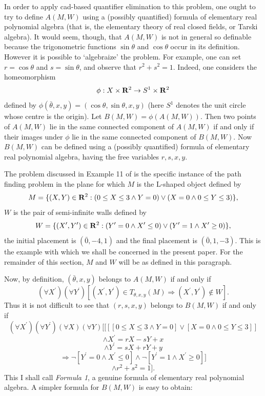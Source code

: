 In order to apply cad-based quantifier elimination to this problem,
one ought to try to define $A(M,W)$ using a (possibly quantified)
formula of elementary real polynomial algebra (that is, the elementary theory
of real closed fields, or Tarski algebra).
It would seem, though, that $A(M,W)$ is not in general so definable
because the trigonometric functions $\sin \theta$ and $\cos \theta$
occur in its definition. However it is possible to `algebraize'
the problem. For example, one can set $r = \cos \theta$ and $s = \sin \theta$,
and observe that $r^{2} + s^{2} = 1$. Indeed, one considers the
homeomorphism 
\[\phi : X \times {\bf R}^{2} \rightarrow S^{1} \times {\bf R}^{2}\]
defined by $\phi (\bar{\theta},x,y) = (\cos \theta ,\sin \theta ,x,y)$
(here $S^{1}$ denotes the unit circle whose centre is the origin).
Let $B(M,W) = \phi (A(M,W))$. Then two points of $A(M,W)$ lie in the
same connected component of $A(M,W)$ if and only if their images under
$\phi$ lie in the same connected component of $B(M,W)$. Now $B(M,W)$
can be defined using a (possibly quantified) formula of elementary real
polynomial algebra, having the free variables $r, s, x, y$.

The problem discussed in Example 11 of \cite{Kalkbrener_Stifter:87}
is the specific instance of the path finding problem in the plane
for which $M$ is the L-shaped object defined by
\[ M = \{(X,Y) \in {\bf R}^{2} : (0 \le X \le 3 \wedge Y = 0)
                         \vee (X = 0 \wedge 0 \le Y \le 3)\},\]
$W$ is the pair of semi-infinite walls defined by
\[W = \{(X^{\prime},Y^{\prime}) \in {\bf R}^{2} :
                          (Y^{\prime} = 0 \wedge X^{\prime} \le 0)
                      \vee (Y^{\prime} = 1 \wedge X^{\prime} \ge 0)\},\]
the initial placement is $(\bar{0},-4,1)$ and the
final placement is $(\bar{0},1,-3)$.
This is the example with which we shall be concerned in the present
paper. For the remainder of this section, $M$ and $W$ will be as defined
in this paragraph.

Now, by definition, $(\bar{\theta},x,y)$ belongs to $A(M,W)$ if and only if
\[(\forall X^{\prime})(\forall Y^{\prime})
           [(X^{\prime},Y^{\prime}) \in T_{\theta ,x,y}(M) \Rightarrow
            (X^{\prime},Y^{\prime}) \not\in W ] .\]
Thus it is not difficult to see that $(r,s,x,y)$ belongs to $B(M,W)$ 
if and only if
\[(\forall X^{\prime})(\forall Y^{\prime})(\forall X)(\forall Y)
   [[[[0 \le X \le 3 \wedge Y = 0] \vee [X = 0 \wedge 0 \le Y \le 3]]\]
 \[    \wedge X^{\prime} = rX - sY + x\]
 \[    \wedge Y^{\prime} = sX + rY + y\]
 \[    \Rightarrow \neg [Y^{\prime} = 0 \wedge X^{\prime} \le 0]
                 \wedge \neg [Y^{\prime} = 1 \wedge X^{\prime} \ge 0]  ]\]
 \[              \wedge r^{2} + s^{2} = 1 ].\]
This I shall call {\em Formula 1}, a genuine formula of elementary
real polynomial algebra.
A simpler formula for $B(M,W)$ is easy to obtain:

